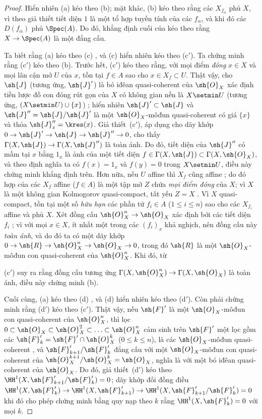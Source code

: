 \documentclass[oneside,10pt]{amsart}
\makeatletter
\renewcommand{\leq}{\leqslant}
\newcommand{\ega@arrow}[2]{\mathchoice{#1}{#2}{#2}{#2}}
\renewcommand{\to}{\ega@arrow{\longrightarrow}{\rightarrow}}
\newcommand{\oldpage}[2][]{\marginnote{\normalfont\footnotesize\textbf{#1}~|~#2}\ignorespaces}
\makeatother
\begin{document}
\begin{proof}
Hiển nhiên (a) kéo theo (b);
mặt khác, (b) kéo theo rằng các $X_{f_\alpha}$ phủ $X$, vì theo giả thiết tiết diện $1$ là một tổ hợp tuyến tính của các $f_\alpha$, và khi đó các $D(f_\alpha)$ phủ $\Spec(A)$.
Do đó, khẳng định cuối của  kéo theo rằng $X\to\Spec(A)$ là một đẳng cấu.

Ta biết rằng (a) kéo theo (c) , và (c) hiển nhiên kéo theo (c$'$).
Ta chứng minh rằng (c$'$) kéo theo (b).
Trước hết, (c$'$) kéo theo rằng, với mọi điểm \emph{đóng} $x\in X$ và mọi lân cận mở $U$ của $x$, tồn tại $f\in A$ sao cho $x\in X_f\subset U$.
Thật vậy, cho $\sh{J}$ (tương ứng, $\sh{J}'$) là bó iđêan quasi-coherent của $\sh{O}_X$ xác định tiền lược đồ con đóng rút gọn của $X$ có không gian nền là $X\setmin U$ (tương ứng, $(X\setmin U)\cup\{x\}$) ;
hiển nhiên $\sh{J}'\subset\sh{J}$ và $\sh{J}''=\sh{J}/\sh{J}'$ là một $\sh{O}_X$-môđun quasi-coherent có giá $\{x\}$ và thỏa $\sh{J}_x''=\kres(x)$.
Giả thiết~(c$'$), áp dụng cho dãy khớp $0\to\sh{J}'\to\sh{J}\to\sh{J}''\to0$, cho thấy $\Gamma(X,\sh{J})\to\Gamma(X,\sh{J}'')$ là toàn ánh.
Do đó, tiết diện của $\sh{J}''$ có mầm tại $x$ bằng $1_x$ là ảnh của một tiết diện $f\in\Gamma(X,\sh{J})\subset\Gamma(X,\sh{O}_X)$, và theo định nghĩa ta có $f(x)=1_x$ và $f(y)=0$ trong $X\setmin U$, điều này chứng minh khẳng định trên.
Hơn nữa, nếu $U$ affine thì $X_f$ cũng affine ; do đó hợp của các $X_f$ affine ($f\in A$) là một tập mở $Z$ chứa \emph{mọi điểm đóng} của $X$;
vì $X$ là một không gian Kolmogorov quasi-compact, tất yếu $Z=X$ .
Vì $X$ quasi-compact, tồn tại một số \emph{hữu hạn} các phần tử $f_i\in A$ ($1\leq i\leq n$) sao cho các $X_{f_i}$ affine và phủ $X$.
Xét đồng cấu $\sh{O}_X^n\to\sh{O}_X$ xác định bởi các tiết diện $f_i$ ;
vì với mọi $x\in X$, ít nhất một trong các $(f_i)_x$ khả nghịch, nên đồng cấu này \emph{toàn ánh}, và do đó ta có một dãy khớp $0\to\sh{R}\to\sh{O}_X^n\to\sh{O}_X\to0$, trong đó $\sh{R}$ là một $\sh{O}_X$-môđun con quasi-coherent của $\sh{O}_X^n$.
Khi đó, từ

\oldpage[II]{98}
(c$'$) suy ra rằng đồng cấu tương ứng $\Gamma(X,\sh{O}_X^n)\to\Gamma(X,\sh{O}_X)$ là toàn ánh, điều này chứng minh (b).

Cuối cùng, (a) kéo theo (d) , và (d) hiển nhiên kéo theo (d$'$).
Còn phải chứng minh rằng (d$'$) kéo theo (c$'$).
Thật vậy, nếu $\sh{F}'$ là một $\sh{O}_X$-môđun con quasi-coherent của $\sh{O}_X^n$, thì lọc $0\subset\sh{O}_X\subset\sh{O}_X^2\subset\ldots\subset\sh{O}_X^n$ cảm sinh trên $\sh{F}'$ một lọc gồm các $\sh{F}'_k=\sh{F}'\cap\sh{O}_X^k$ ($0\leq k\leq n$), là các $\sh{O}_X$-môđun quasi-coherent , và $\sh{F}'_{k+1}/\sh{F}'_k$ đẳng cấu với một $\sh{O}_X$-môđun con quasi-coherent của $\sh{O}_X^{k+1}/\sh{O}_X^k=\sh{O}_X$, nghĩa là với một bó iđêan quasi-coherent của $\sh{O}_X$.
Do đó, giả thiết~(d$'$) kéo theo $\HH^1(X,\sh{F}'_{k+1}/\sh{F}'_k)=0$;
dãy khớp đối đồng điều $\HH^1(X,\sh{F}'_k)\to\HH^1(X,\sh{F}'_{k+1})\to\HH^1(X,\sh{F}'_{k+1}/\sh{F}'_k)=0$ khi đó cho phép chứng minh bằng quy nạp theo $k$ rằng $\HH^1(X,\sh{F}'_k)=0$ với mọi $k$.
\end{proof}
\end{document}
